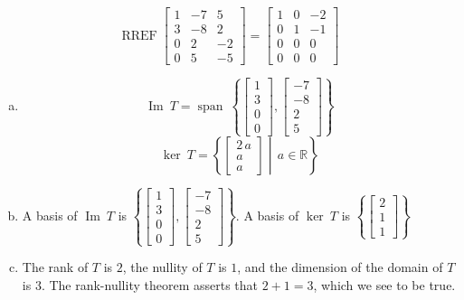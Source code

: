 \begin{exerciseAnswer} 


\[\operatorname{RREF} \left[\begin{array}{ccc}
1 & -7 & 5 \\
3 & -8 & 2 \\
0 & 2 & -2 \\
0 & 5 & -5
\end{array}\right] = \left[\begin{array}{ccc}
1 & 0 & -2 \\
0 & 1 & -1 \\
0 & 0 & 0 \\
0 & 0 & 0
\end{array}\right] \]


\begin{enumerate}[(a)]
\item \[\operatorname{Im}\ T = \operatorname{span}\  \left\{ \left[\begin{array}{c}
1 \\
3 \\
0 \\
0
\end{array}\right] , \left[\begin{array}{c}
-7 \\
-8 \\
2 \\
5
\end{array}\right] \right\} \]\[\operatorname{ker}\ T =  \left\{ \left[\begin{array}{c}
2 \, a \\
a \\
a
\end{array}\right] \middle|\,a\in\mathbb{R}\right\} \]
\item  A basis of \(\operatorname{Im}\ T\) is \( \left\{ \left[\begin{array}{c}
1 \\
3 \\
0 \\
0
\end{array}\right] , \left[\begin{array}{c}
-7 \\
-8 \\
2 \\
5
\end{array}\right] \right\} \). A basis of \(\operatorname{ker}\ T\) is \( \left\{ \left[\begin{array}{c}
2 \\
1 \\
1
\end{array}\right] \right\} \)
\item  The rank of \(T\) is \( 2 \), the nullity of \(T\) is \( 1 \), and the dimension of the domain of \(T\) is \( 3 \). The rank-nullity theorem asserts that \( 2 + 1 = 3 \), which we see to be true. 
\end{enumerate}
    
\end{exerciseAnswer}
    
